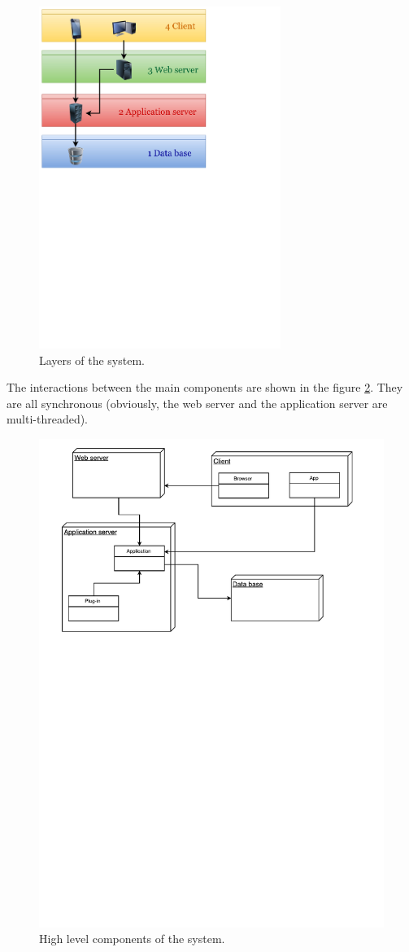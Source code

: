 \begin{figure}[h]
\centering
\includegraphics[width=0.7\textwidth]{diagrams/layers.pdf}
\caption{Layers of the system.}
\label{fig:layers}
\end{figure}

The interactions between the main components are shown in the figure \ref{fig:high_level_components}. They are all synchronous (obviously, the web server and the application server are multi-threaded).

\begin{figure}[h]
\centering
\includegraphics[width=\textwidth]{diagrams/high_level_components.pdf}
\caption{High level components of the system.}
\label{fig:high_level_components}
\end{figure}
